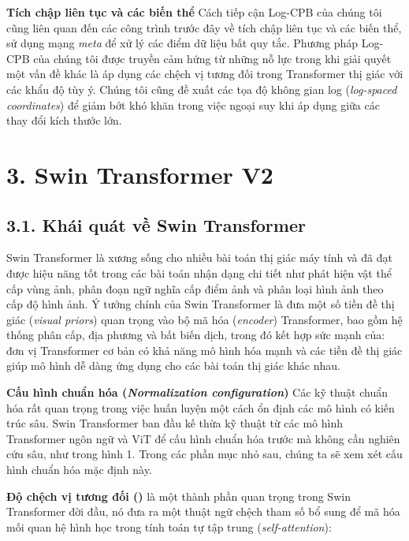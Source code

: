 \documentclass[times, twocolumn]{zHenriquesLab-StyleBioRxiv}
\begin{document}
\vspace*{5mm}
\textbf{Tích chập liên tục và các biến thể} Cách tiếp cận Log-CPB của chúng tôi cũng liên quan đến các công trình trước đây về tích chập liên tục và các biến thể, sử dụng mạng \textit{meta} để xử lý các điểm dữ liệu bất quy tắc. Phương pháp Log-CPB của chúng tôi được truyền cảm hứng từ những nỗ lực trong khi giải quyết một vấn đề khác là áp dụng các chệch vị tương đối trong Transformer thị giác với các khẩu độ tùy ý. Chúng tôi cũng đề xuất các tọa độ không gian log (\textit{log-spaced coordinates}) để giảm bớt khó khăn trong việc ngoại suy khi áp dụng giữa các thay đổi kích thước lớn.

\section*{3. Swin Transformer V2}
\subsection*{3.1. Khái quát về Swin Transformer}
Swin Transformer là xương sống cho nhiều bài toán thị giác máy tính và đã đạt được hiệu năng tốt trong các bài toán nhận dạng chi tiết như phát hiện vật thể cấp vùng ảnh, phân đoạn ngữ nghĩa cấp điểm ảnh và phân loại hình ảnh theo cấp độ hình ảnh. Ý tưởng chính của Swin Transformer là đưa một số tiền đề thị giác (\textit{visual priors}) quan trọng vào bộ mã hóa (\textit{encoder}) Transformer, bao gồm hệ thống phân cấp, địa phương và bất biến dịch, trong đó kết hợp sức mạnh của: đơn vị Transformer cơ bản có khả năng mô hình hóa mạnh và các tiền đề thị giác giúp mô hình dễ dàng ứng dụng cho các bài toán thị giác khác nhau.

\vspace*{5mm}
\textbf{Cấu hình chuẩn hóa (\textit{Normalization configuration})} Các kỹ thuật chuẩn hóa rất quan trọng trong việc huấn luyện một cách ổn định các mô hình có kiến trúc sâu. Swin Transformer ban đầu kế thừa kỹ thuật từ các mô hình Transformer ngôn ngữ và ViT để cấu hình chuẩn hóa trước mà không cần nghiên cứu sâu, như trong hình 1. Trong các phần mục nhỏ sau, chúng ta sẽ xem xét cấu hình chuẩn hóa mặc định này.

\vspace*{5mm}
\textbf{Độ chệch vị tương đối ()} là một thành phần quan trọng trong Swin Transformer đời đầu, nó đưa ra một thuật ngữ chệch tham số bổ sung để mã hóa mối quan hệ hình học trong tính toán tự tập trung (\textit{self-attention}):
\end{document}
